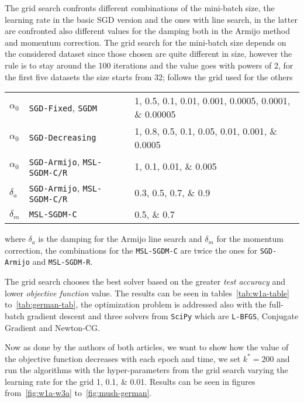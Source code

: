 The grid search confronts different combinations of the mini-batch size, the learning rate in the basic SGD version and the ones with line search, in the latter are confronted also different values for the damping both in the Armijo method and momentum correction. The grid search for the mini-batch size depends on the considered dataset since those chosen are quite different in size, however the rule is to stay around the 100 iterations and the value goes with powers of 2, for the first five datasets the size starts from 32; follows the grid used for the others
\begin{center}
\begin{tabular}{lll}
\toprule
$\alpha_0$ & \texttt{SGD-Fixed}, \texttt{SGDM} & \numlist{1; 0.5; 0.1; 0.01; 0.001; 0.0005; 0.0001; 0.00005} \\
$\alpha_0$ & \texttt{SGD-Decreasing} & \numlist{1; 0.8; 0.5; 0.1; 0.05; 0.01; 0.001; 0.0005} \\
$\alpha_0$ & \texttt{SGD-Armijo}, \texttt{MSL-SGDM-C/R} & \numlist{1; 0.1; 0.01; 0.005} \\
$\delta_a$ & \texttt{SGD-Armijo}, \texttt{MSL-SGDM-C/R} & \numlist{0.3; 0.5; 0.7; 0.9} \\
$\delta_m$ & \texttt{MSL-SGDM-C} & \numlist{0.5; 0.7} \\
\bottomrule
\end{tabular}
\end{center}
where $\delta_a$ is the damping for the Armijo line search and $\delta_m$ for the momentum correction, the combinations for the \texttt{MSL-SGDM-C} are twice the ones for \texttt{SGD-Armijo} and \texttt{MSL-SGDM-R}.

The grid search chooses the best solver based on the greater \emph{test accuracy} and lower \emph{objective function} value. The results can be seen in tables~\vref{tab:w1a-table} to~\ref{tab:german-tab}, the optimization problem is addressed also with the full-batch gradient descent and three solvers from \texttt{SciPy} which are \texttt{L-BFGS}, Conjugate Gradient and Newton-CG.\par\smallskip

Now as done by the authors of both articles, we want to show how the value of the objective function decreases with each epoch and time, we set $k^\ast=200$ and run the algorithms with the hyper-parameters from the grid search varying the learning rate for the grid \numlist{1; 0.1; 0.01}. Results can be seen in figures from~\vref{fig:w1a-w3a} to~\ref{fig:mush-german}.

